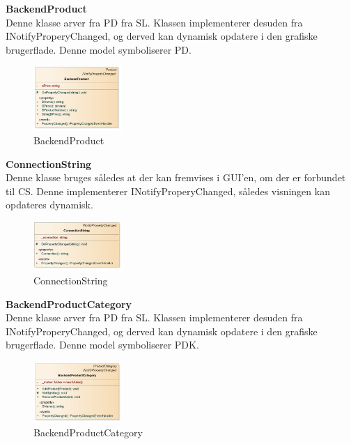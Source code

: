  \textbf{BackendProduct}\\
Denne klasse arver fra \gls{PD} fra \gls{SL}. Klassen implementerer desuden fra INotifyProperyChanged, og derved kan dynamisk opdatere i den grafiske brugerflade. Denne model symboliserer \gls{PD}.
\begin{center}
\begin{figure}[!h]
    \centering
    \includegraphics[width=0.30\textwidth]{Systemdesign/backend/klassebeskrivelser/Images/Backendproduct.png}
    \caption{BackendProduct}
    \label{fig:BackendProduct}
\end{figure}
\end{center}
\label{BackendProduct_Beskrivelse}
 \bigskip 
 
 
  \textbf{ConnectionString}\\
Denne klasse bruges således at der kan fremvises i GUI'en, om der er forbundet til \gls{CS}. Denne implementerer INotifyProperyChanged, således visningen kan opdateres dynamisk.
\begin{center}
\begin{figure}[!h]
    \centering
    \includegraphics[width=0.30\textwidth]{Systemdesign/backend/klassebeskrivelser/Images/const.png}
    \caption{ConnectionString}
    \label{fig:ConnectionString}
\end{figure}
\end{center}
\label{ConnectionString_Beskrivelse}
 \bigskip 


 \textbf{BackendProductCategory}\\
Denne klasse arver fra \gls{PD} fra \gls{SL}. Klassen implementerer desuden fra INotifyProperyChanged, og derved kan dynamisk opdatere i den grafiske brugerflade. Denne model symboliserer \gls{PDK}.
\begin{center}
\begin{figure}[!h]
    \centering
    \includegraphics[width=0.30\textwidth]{Systemdesign/backend/klassebeskrivelser/Images/Backendproductcat.png}
    \caption{BackendProductCategory}
    \label{fig:BackendProductCategory}
\end{figure}
\end{center}
\label{BackendProductCategoryr_Beskrivelse}
 \bigskip 


